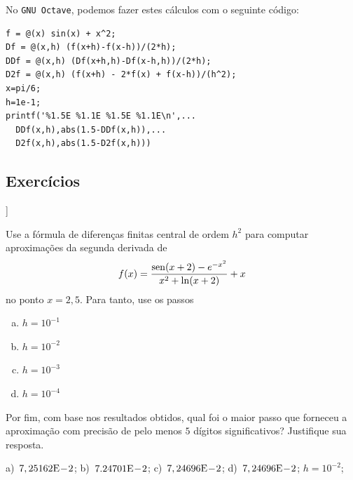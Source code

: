 \begin{ex}
No \verb+GNU Octave+, podemos fazer estes cálculos com o seguinte código:
\begin{verbatim}
f = @(x) sin(x) + x^2;
Df = @(x,h) (f(x+h)-f(x-h))/(2*h);
DDf = @(x,h) (Df(x+h,h)-Df(x-h,h))/(2*h);
D2f = @(x,h) (f(x+h) - 2*f(x) + f(x-h))/(h^2);
x=pi/6;
h=1e-1;
printf('%1.5E %1.1E %1.5E %1.1E\n',...
  DDf(x,h),abs(1.5-DDf(x,h)),...
  D2f(x,h),abs(1.5-D2f(x,h)))
\end{verbatim}
\end{ex}

\subsection*{Exercícios}

\begin{flushleft}
  [[tag:revisar]]
\end{flushleft}

\begin{exer}\label{exer:d2fc_fun}
  Use a fórmula de diferenças finitas central de ordem $h^2$ para computar aproximações da segunda derivada de
  \begin{equation}
    f(x) = \frac{\operatorname{sen}(x+2) - e^{-x^2}}{x^2 + \ln(x+2)}+x
  \end{equation}
no ponto $x=2,5$. Para tanto, use os passos
\begin{enumerate}[a)]
\item $h=10^{-1}$
\item $h=10^{-2}$
\item $h=10^{-3}$
\item $h=10^{-4}$
\end{enumerate}
Por fim, com base nos resultados obtidos, qual foi o maior passo que forneceu a aproximação com precisão de pelo menos $5$ dígitos significativos? Justifique sua resposta.
\end{exer}
\begin{resp}
  a)~$7,25162\mathrm{E}\!-\!2$; b)~$7.24701\mathrm{E}\!-\!2$; c)~$7,24696\mathrm{E}\!-\!2$; d)~$7,24696\mathrm{E}\!-\!2$; $h=10^{-2}$;
\end{resp}

